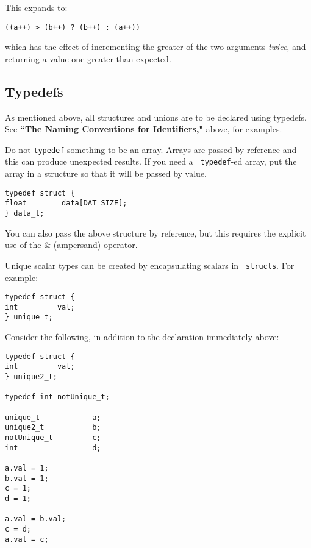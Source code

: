 This expands to:
\begin{verbatim}
((a++) > (b++) ? (b++) : (a++))
\end{verbatim}
which has the effect of incrementing the greater of the two arguments
{\em twice}, and
returning a value one greater than expected.

\subsection{Typedefs}

As mentioned above, all structures and unions are to be declared using
typedefs.  See {\bf ``The Naming Conventions for Identifiers,"} above,
for examples.

Do not {\tt typedef} something to be an array.  Arrays are passed by
reference and this can produce unexpected results.  If you need a {\tt
typedef}-ed array, put the array in a structure so that it will be
passed by value.
\begin{verbatim}
typedef struct {
float        data[DAT_SIZE];
} data_t;
\end{verbatim}

You can also pass the above structure by reference, but this requires
the explicit use of the \& (ampersand) operator.

Unique scalar types can be created by encapsulating scalars in {\tt
structs}.  For example:
\begin{verbatim}
typedef struct {
int         val;
} unique_t;
\end{verbatim}

Consider the following, in addition to the declaration immediately above:
\begin{verbatim}
typedef struct {
int         val;
} unique2_t;

typedef int notUnique_t;

unique_t            a;
unique2_t           b;
notUnique_t         c;
int                 d;

a.val = 1;
b.val = 1;
c = 1;
d = 1;

a.val = b.val;
c = d;
a.val = c;
\end{verbatim}

